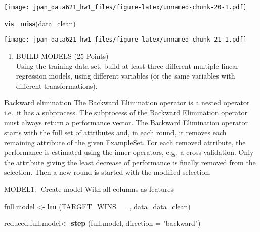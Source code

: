 \documentclass[]{article}
\newenvironment{Shaded}{\begin{snugshade}}{\end{snugshade}}
\newcommand{\KeywordTok}[1]{\textcolor[rgb]{0.13,0.29,0.53}{\textbf{#1}}}
\newcommand{\DataTypeTok}[1]{\textcolor[rgb]{0.13,0.29,0.53}{#1}}
\newcommand{\StringTok}[1]{\textcolor[rgb]{0.31,0.60,0.02}{#1}}
\newcommand{\OperatorTok}[1]{\textcolor[rgb]{0.81,0.36,0.00}{\textbf{#1}}}
\newcommand{\NormalTok}[1]{#1}
\providecommand{\tightlist}{%
  \setlength{\itemsep}{0pt}\setlength{\parskip}{0pt}}
\begin{document}
\texttt{[image: jpan\_data621\_hw1\_files/figure-latex/unnamed-chunk-20-1.pdf]}

\begin{Shaded}
\begin{Highlighting}[]
\KeywordTok{vis_miss}\NormalTok{(data_clean)}
\end{Highlighting}
\end{Shaded}

\texttt{[image: jpan\_data621\_hw1\_files/figure-latex/unnamed-chunk-21-1.pdf]}

\begin{enumerate}
\def\labelenumi{\arabic{enumi}.}
\setcounter{enumi}{2}
\tightlist
\item
  BUILD MODELS (25 Points)\\
  Using the training data set, build at least three different multiple
  linear regression models, using different variables (or the same
  variables with different transformations).
\end{enumerate}

Backward elimination The Backward Elimination operator is a nested
operator i.e.~it has a subprocess. The subprocess of the Backward
Elimination operator must always return a performance vector. The
Backward Elimination operator starts with the full set of attributes
and, in each round, it removes each remaining attribute of the given
ExampleSet. For each removed attribute, the performance is estimated
using the inner operators, e.g.~a cross-validation. Only the attribute
giving the least decrease of performance is finally removed from the
selection. Then a new round is started with the modified selection.

MODEL1:- Create model With all columns as features

\begin{Shaded}
\begin{Highlighting}[]
\NormalTok{full.model <-}\StringTok{ }\KeywordTok{lm}\NormalTok{ (TARGET_WINS }\OperatorTok{~}\StringTok{   }\NormalTok{. , }\DataTypeTok{data=}\NormalTok{data_clean)}

\NormalTok{reduced.full.model<-}\StringTok{ }\KeywordTok{step}\NormalTok{ (full.model, }\DataTypeTok{direction =} \StringTok{"backward"}\NormalTok{)    }
\end{Highlighting}
\end{Shaded}
\end{document}
